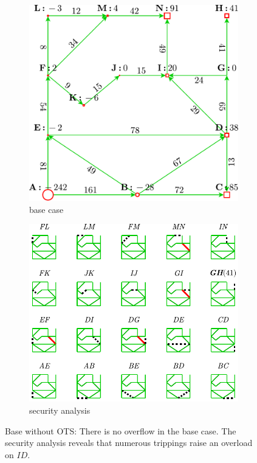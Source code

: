 \begin{figure}[h]
    \begin{subfigure}
        [t]{.43\linewidth}
        \includegraphics[width=\linewidth]{images/case_base.pdf}
        \caption{base case}
        \label{fig:case base}
    \end{subfigure}\hfill
    \begin{subfigure}
        [t]{.48\linewidth}
        \includegraphics[width=\linewidth]{images/grid_base.pdf}
        \caption{security analysis}
        \label{fig:grid base}
    \end{subfigure}
    \caption{Base without OTS: There is no overflow in the base case. The
    security analysis reveals that numerous trippings raise an overload on $ID$.}
    \label{fig:base}
\end{figure}

